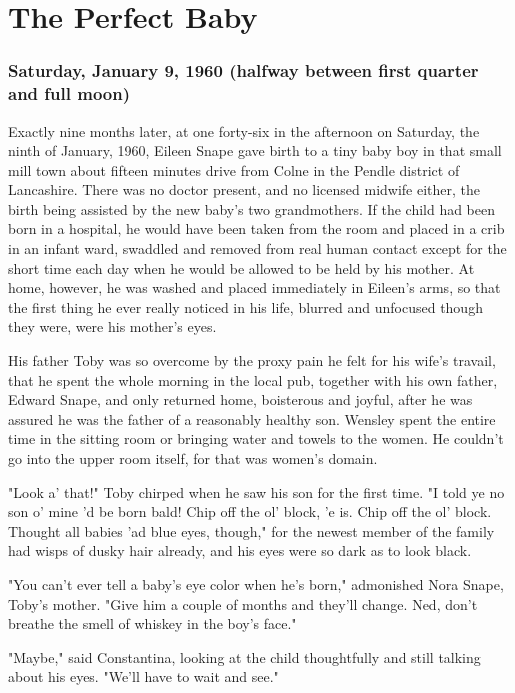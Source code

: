 
\chapter{The Perfect Baby}

\subsection{Saturday, January 9, 1960 (halfway between first quarter and full moon)}

Exactly nine months later, at one forty-six in the afternoon on Saturday, the ninth of January, 1960, Eileen Snape gave birth to a tiny baby boy in that small mill town about fifteen minutes drive from Colne in the Pendle district of Lancashire. There was no doctor present, and no licensed midwife either, the birth being assisted by the new baby's two grandmothers. If the child had been born in a hospital, he would have been taken from the room and placed in a crib in an infant ward, swaddled and removed from real human contact except for the short time each day when he would be allowed to be held by his mother. At home, however, he was washed and placed immediately in Eileen's arms, so that the first thing he ever really noticed in his life, blurred and unfocused though they were, were his mother's eyes.

His father Toby was so overcome by the proxy pain he felt for his wife's travail, that he spent the whole morning in the local pub, together with his own father, Edward Snape, and only returned home, boisterous and joyful, after he was assured he was the father of a reasonably healthy son. Wensley spent the entire time in the sitting room or bringing water and towels to the women. He couldn't go into the upper room itself, for that was women's domain.

"Look a' that!" Toby chirped when he saw his son for the first time. "I told ye no son o' mine 'd be born bald! Chip off the ol' block, 'e is. Chip off the ol' block. Thought all babies 'ad blue eyes, though," for the newest member of the family had wisps of dusky hair already, and his eyes were so dark as to look black.

"You can't ever tell a baby's eye color when he's born," admonished Nora Snape, Toby's mother. "Give him a couple of months and they'll change. Ned, don't breathe the smell of whiskey in the boy's face."

"Maybe," said Constantina, looking at the child thoughtfully and still talking about his eyes. "We'll have to wait and see."

